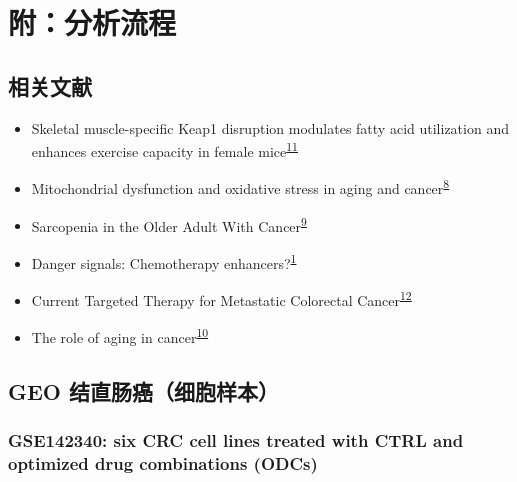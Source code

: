 \documentclass[
]{article}
\providecommand{\tightlist}{%
  \setlength{\itemsep}{0pt}\setlength{\parskip}{0pt}}
\begin{document}
\hypertarget{supp}{%
\section{附：分析流程}\label{supp}}

\hypertarget{ux76f8ux5173ux6587ux732e}{%
\subsection{相关文献}\label{ux76f8ux5173ux6587ux732e}}

\begin{itemize}
\tightlist
\item
  Skeletal muscle-specific Keap1 disruption modulates fatty acid utilization and enhances exercise capacity in female mice\textsuperscript{\protect\hyperlink{ref-SkeletalMuscleOnoki2021}{11}}
\item
  Mitochondrial dysfunction and oxidative stress in aging and cancer\textsuperscript{\protect\hyperlink{ref-MitochondrialDKudrya2016}{8}}
\item
  Sarcopenia in the Older Adult With Cancer\textsuperscript{\protect\hyperlink{ref-SarcopeniaInTWillia2021}{9}}
\item
  Danger signals: Chemotherapy enhancers?\textsuperscript{\protect\hyperlink{ref-DangerSignalsVargas2017}{1}}
\item
  Current Targeted Therapy for Metastatic Colorectal Cancer\textsuperscript{\protect\hyperlink{ref-CurrentTargeteOhishi2023}{12}}
\item
  The role of aging in cancer\textsuperscript{\protect\hyperlink{ref-TheRoleOfAgiHavas2022}{10}}
\end{itemize}

\hypertarget{geo-ux7ed3ux76f4ux80a0ux764cux7ec6ux80deux6837ux672c}{%
\subsection{GEO 结直肠癌（细胞样本）}\label{geo-ux7ed3ux76f4ux80a0ux764cux7ec6ux80deux6837ux672c}}

\hypertarget{gse142340-six-crc-cell-lines-treated-with-ctrl-and-optimized-drug-combinations-odcs}{%
\subsubsection{GSE142340: six CRC cell lines treated with CTRL and optimized drug combinations (ODCs)}\label{gse142340-six-crc-cell-lines-treated-with-ctrl-and-optimized-drug-combinations-odcs}}
\end{document}
